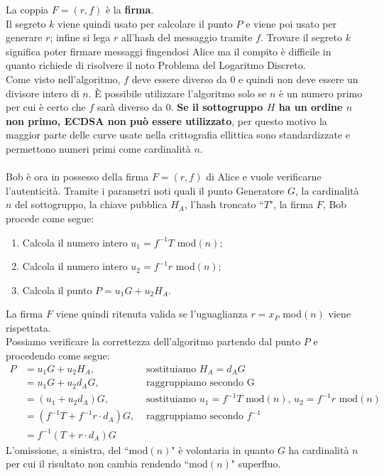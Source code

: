 \documentclass[a4paper,12pt]{tesiinfo}
\begin{document}
La coppia $F = (r, f)$ \`e la \textbf{firma}.
\\
Il segreto $k$ viene quindi usato per calcolare il punto $P$ e viene poi usato per generare $r$; infine si lega $r$ all'hash del messaggio tramite $f$. Trovare il segreto $k$ significa poter firmare messaggi fingendosi Alice ma il compito \`e difficile in quanto richiede di risolvere il noto Problema del Logaritmo Discreto.
\\
Come visto nell'algoritmo, $f$ deve essere diverso da $0$ e quindi non deve essere un divisore intero di $n$. \`E possibile utilizzare l'algoritmo solo se $n$ \`e un numero primo per cui \`e certo che $f$ sar\`a diverso da $0$. \textbf{Se il sottogruppo $H$ ha un ordine $n$ non primo, ECDSA non pu\`o essere utilizzato}, per questo motivo la maggior parte delle curve usate nella crittografia ellittica sono standardizzate e permettono numeri primi come cardinalit\`a $n$.
\\
\\
Bob \`e ora in possesso della firma $F = (r, f)$ di Alice e vuole verificarne l'autenticit\`a. Tramite i parametri noti quali il punto Generatore $G$, la cardinalit\`a $n$ del sottogruppo, la chiave pubblica $H_A$, l'hash troncato ``$T$", la firma $F$, Bob procede come segue:
\begin{enumerate}
 \item Calcola il numero intero $u_1 = f^{-1}T$ mod$(n)$;
 \item Calcola il numero intero $u_2 = f^{-1}r$ mod$(n)$;
 \item Calcola il punto $P = u_1G + u_2H_A$.
\end{enumerate}
La firma $F$ viene quindi ritenuta valida se l'uguaglianza $r = x_P $ mod$(n)$ viene rispettata.
\\
Possiamo verificare la correttezza dell'algoritmo partendo dal punto $P$ e procedendo come segue:
\begin{align*}
 P &= u_1G + u_2H_A, &\text{ sostituiamo } H_A = d_AG\\
 &= u_1G + u_2d_AG, &\text{ raggruppiamo secondo G }\\
 &= (u_1 + u_2d_A)G, &\text{ sostituiamo } u_1 = f^{-1}T \text{ mod$(n)$, } u_2 = f^{-1}r\text{ mod$(n)$}\\
 &= (f^{-1}T + f^{-1}r \cdot d_A)G, &\text{ raggruppiamo secondo } f^{-1}\\
 &= f^{-1}(T + r \cdot d_A)G
\end{align*}
L'omissione, a sinistra, del ``mod$(n)$" \`e volontaria in quanto $G$ ha cardinalit\`a $n$ per cui il risultato non cambia rendendo ``mod$(n)$" superfluo.
\end{document}
